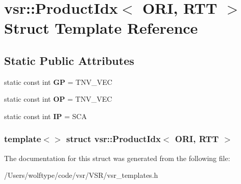 \hypertarget{structvsr_1_1_product_idx_3_01_o_r_i_00_01_r_t_t_01_4}{\section{vsr\-:\-:Product\-Idx$<$ O\-R\-I, R\-T\-T $>$ Struct Template Reference}
\label{structvsr_1_1_product_idx_3_01_o_r_i_00_01_r_t_t_01_4}
}
\subsection*{Static Public Attributes}
\begin{DoxyCompactItemize}
\item 
\hypertarget{structvsr_1_1_product_idx_3_01_o_r_i_00_01_r_t_t_01_4_abe9b6076a50c1bb480b474e48a8f8056}{static const int {\bfseries G\-P} = T\-N\-V\-\_\-\-V\-E\-C}\label{structvsr_1_1_product_idx_3_01_o_r_i_00_01_r_t_t_01_4_abe9b6076a50c1bb480b474e48a8f8056}

\item 
\hypertarget{structvsr_1_1_product_idx_3_01_o_r_i_00_01_r_t_t_01_4_ac98f72198d9abe63a20378e13e0805e4}{static const int {\bfseries O\-P} = T\-N\-V\-\_\-\-V\-E\-C}\label{structvsr_1_1_product_idx_3_01_o_r_i_00_01_r_t_t_01_4_ac98f72198d9abe63a20378e13e0805e4}

\item 
\hypertarget{structvsr_1_1_product_idx_3_01_o_r_i_00_01_r_t_t_01_4_a636391de667de2ee23b2bac8d425c866}{static const int {\bfseries I\-P} = S\-C\-A}\label{structvsr_1_1_product_idx_3_01_o_r_i_00_01_r_t_t_01_4_a636391de667de2ee23b2bac8d425c866}

\end{DoxyCompactItemize}
\subsubsection*{template$<$$>$ struct vsr\-::\-Product\-Idx$<$ O\-R\-I, R\-T\-T $>$}



The documentation for this struct was generated from the following file\-:\begin{DoxyCompactItemize}
\item 
/\-Users/wolftype/code/vsr/\-V\-S\-R/vsr\-\_\-templates.\-h\end{DoxyCompactItemize}
